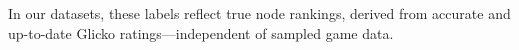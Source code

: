 \documentclass[preview]{standalone}
\begin{document}
In our datasets, these labels reflect true node rankings, derived from accurate and up-to-date Glicko ratings—independent of sampled game data.\\
\end{document}
